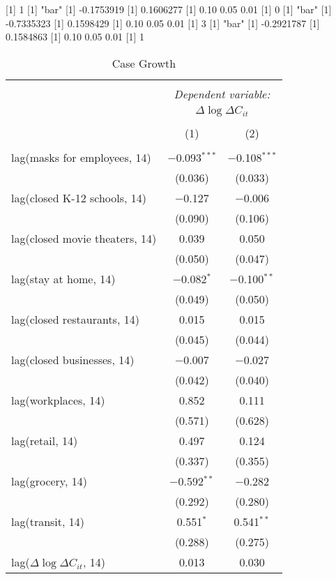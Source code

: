 [1] 1
[1] "bar"
[1] -0.1753919
[1] 0.1606277
[1] 0.10 0.05 0.01
[1] 0
[1] "bar"
[1] -0.7335323
[1] 0.1598429
[1] 0.10 0.05 0.01
[1] 3
[1] "bar"
[1] -0.2921787
[1] 0.1584863
[1] 0.10 0.05 0.01
[1] 1

\begin{table}[!htbp] \centering 
  \caption{Case Growth} 
  \label{} 
\begin{tabular}{@{\extracolsep{1pt}}lcc} 
\\[-1.8ex]\hline 
\hline \\[-1.8ex] 
 & \multicolumn{2}{c}{\textit{Dependent variable:}} \\ 
\cline{2-3} 
 & \multicolumn{2}{c}{$\Delta \log \Delta C_{it}$} \\ 
\\[-1.8ex] & (1) & (2)\\ 
\hline \\[-1.8ex] 
 lag(masks for employees, 14) & $-$0.093$^{***}$ & $-$0.108$^{***}$ \\ 
  & (0.036) & (0.033) \\ 
  lag(closed K-12 schools, 14) & $-$0.127 & $-$0.006 \\ 
  & (0.090) & (0.106) \\ 
  lag(closed movie theaters, 14) & 0.039 & 0.050 \\ 
  & (0.050) & (0.047) \\ 
  lag(stay at home, 14) & $-$0.082$^{*}$ & $-$0.100$^{**}$ \\ 
  & (0.049) & (0.050) \\ 
  lag(closed restaurants, 14) & 0.015 & 0.015 \\ 
  & (0.045) & (0.044) \\ 
  lag(closed businesses, 14) & $-$0.007 & $-$0.027 \\ 
  & (0.042) & (0.040) \\ 
  lag(workplaces, 14) & 0.852 & 0.111 \\ 
  & (0.571) & (0.628) \\ 
  lag(retail, 14) & 0.497 & 0.124 \\ 
  & (0.337) & (0.355) \\ 
  lag(grocery, 14) & $-$0.592$^{**}$ & $-$0.282 \\ 
  & (0.292) & (0.280) \\ 
  lag(transit, 14) & 0.551$^{*}$ & 0.541$^{**}$ \\ 
  & (0.288) & (0.275) \\ 
  lag($\Delta \log \Delta C_{it}$, 14) & 0.013 & 0.030 \\ 

\end{tabular}
\end{table}
